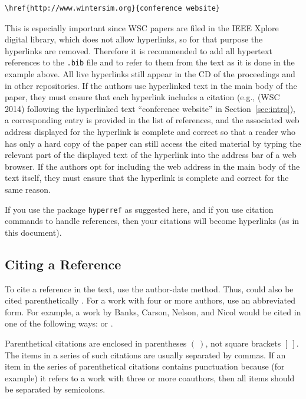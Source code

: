 \documentclass{wscpaperproc}
\theoremstyle{wsc}
\begin{document}
\begin{verbatim}
\href{http://www.wintersim.org}{conference website}
\end{verbatim}\vspace{5 mm}


\noindent This is especially important since WSC papers are filed in the IEEE Xplore digital library, which does not allow hyperlinks, so for that purpose the hyperlinks are removed.
Therefore it is recommended to add all hypertext references to the {\tt .bib} file and to refer to them from the text as it is done in the example above.
All live hyperlinks still appear in the CD of the proceedings and in other repositories.
If the authors use hyperlinked text in the main body of the paper, they must ensure that each hyperlink includes a citation (e.g., (WSC 2014) following the hyperlinked text ``conference website'' in Section~\ref{sec:intro}), a corresponding entry is provided in the list of references, and the associated web address displayed for the hyperlink is complete and correct so that a reader who has only a hard copy of the paper can still access the cited material by typing the relevant part of the displayed text of the hyperlink into the address bar of a web browser.
If the authors opt for including the web address in the main body of the text itself, they must ensure that the hyperlink is complete and correct for the same reason.

If you use the package {\tt hyperref} as suggested here, and if you use citation commands to handle references, then your citations will
become hyperlinks (as in this document).

\subsection{Citing a Reference}
To cite a reference in the text, use the author-date method. Thus,  could also be cited parenthetically \cite{chi89}.
For a work with four or more authors, use an abbreviated form. For example, a work by Banks, Carson, Nelson, and Nicol would be cited in one of the
following ways:
 or .

Parenthetical citations are enclosed in parentheses $(~)$, not square brackets $[~]$.
The items in a series of such citations are usually separated by commas.
If an item in the series of parenthetical citations contains punctuation because (for example) it refers to a work with three or more coauthors, then all items should be separated by semicolons.
\end{document}
